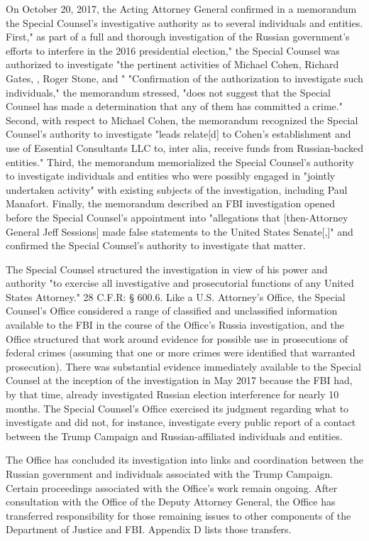 \documentclass{article}
\begin{document}
On October 20, 2017, the Acting Attorney General confirmed in a memorandum the Special Counsel's investigative authority as to several individuals and entities.
First," as part of a full and thorough investigation of the Russian government's efforts to interfere in the 2016 presidential election," the Special Counsel was authorized to investigate "the pertinent activities of Michael Cohen, Richard Gates, , Roger Stone, and " "Confirmation of the authorization to investigate such individuals," the memorandum stressed, "does not suggest that the Special Counsel has made a determination that any of them has committed a crime."
Second, with respect to Michael Cohen, the memorandum recognized the Special Counsel's authority to investigate "leads relate[d] to Cohen's establishment and use of Essential Consultants LLC to, inter alia, receive funds from Russian-backed entities."
Third, the memorandum memorialized the Special Counsel's authority to investigate individuals and entities who were possibly engaged in "jointly undertaken activity" with existing subjects of the investigation, including Paul Manafort.
Finally, the memorandum described an FBI investigation opened before the Special Counsel's appointment into "allegations that [then-Attorney General Jeff Sessions] made false statements to the United States Senate[,]" and confirmed the Special Counsel's authority to investigate that matter.

The Special Counsel structured the investigation in view of his power and authority "to exercise all investigative and prosecutorial functions of any United States Attorney." 28 C.F.R: § 600.6. Like a U.S. Attorney's Office, the Special Counsel's Office considered a range of classified and unclassified information available to the FBI in the course of the Office's Russia investigation, and the Office structured that work around evidence for possible use in prosecutions of federal crimes (assuming that one or more crimes were identified that warranted prosecution).
There was substantial evidence immediately available to the Special Counsel at the inception of the investigation in May 2017 because the FBI had, by that time, already investigated Russian election interference for nearly 10 months.
The Special Counsel's Office exercised its judgment regarding what to investigate and did not, for instance, investigate every public report of a contact between the Trump Campaign and Russian-affiliated individuals and entities.

The Office has concluded its investigation into links and coordination between the Russian government and individuals associated with the Trump Campaign.
Certain proceedings associated with the Office's work remain ongoing.
After consultation with the Office of the Deputy Attorney General, the Office has transferred responsibility for those remaining issues to other components of the Department of Justice and FBI.
Appendix D lists those transfers.
\end{document}
